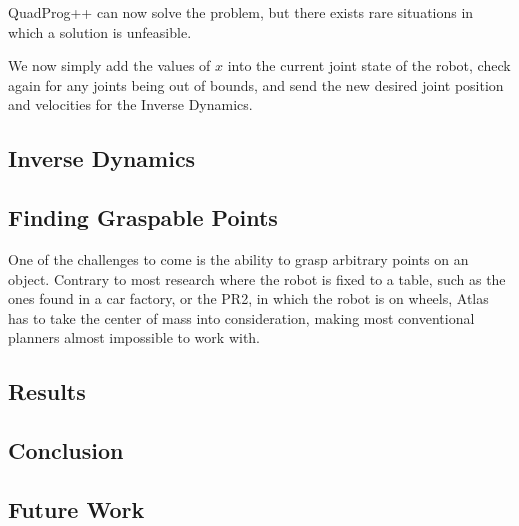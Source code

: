 \documentclass{article}
\begin{document}
QuadProg++ can now solve the problem, but there exists rare situations in which a solution is unfeasible. 

We now simply add the values of $x$ into the current joint state of the robot, check again for any joints being out of bounds, and send the new desired joint position and velocities for the Inverse Dynamics.

\subsection{Inverse Dynamics}


\subsection{Finding Graspable Points}
One of the challenges to come is the ability to grasp arbitrary points on an object. Contrary to most research where the robot is fixed to a table, such as the ones found in a car factory, or the PR2, in which the robot is on wheels, Atlas has to take the center of mass into consideration, making most conventional planners almost impossible to work with.

\subsection{Results}

\subsection{Conclusion}

\subsection{Future Work}

\end{document}
